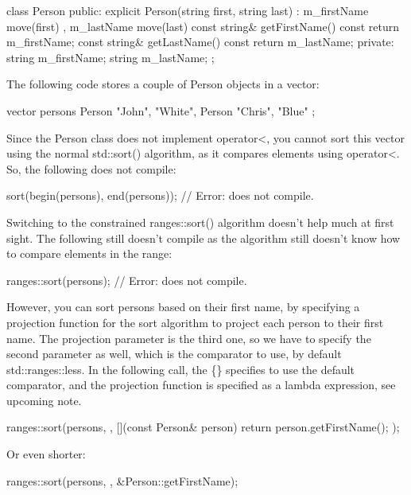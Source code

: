 \begin{cpp}
class Person
{
    public:
        explicit Person(string first, string last)
            : m_firstName { move(first) }, m_lastName { move(last) } { }
        const string& getFirstName() const { return m_firstName; }
        const string& getLastName() const { return m_lastName; }
    private:
        string m_firstName;
        string m_lastName;
};
\end{cpp}

The following code stores a couple of Person objects in a vector:

\begin{cpp}
vector persons { Person {"John", "White"}, Person {"Chris", "Blue"} };
\end{cpp}

Since the Person class does not implement operator<, you cannot sort this vector using the normal std::sort() algorithm, as it compares elements using operator<. So, the following does not compile:

\begin{cpp}
sort(begin(persons), end(persons)); // Error: does not compile.
\end{cpp}

Switching to the constrained ranges::sort() algorithm doesn’t help much at first sight. The following still doesn’t compile as the algorithm still doesn’t know how to compare elements in the range:

\begin{cpp}
ranges::sort(persons); // Error: does not compile.
\end{cpp}

However, you can sort persons based on their first name, by specifying a projection function for the sort algorithm to project each person to their first name. The projection parameter is the third one, so we have to specify the second parameter as well, which is the comparator to use, by default std::ranges::less. In the following call, the \{\} specifies to use the default comparator, and the projection function is specified as a lambda expression, see upcoming note.

\begin{cpp}
ranges::sort(persons, {},
    [](const Person& person) { return person.getFirstName(); });
\end{cpp}

Or even shorter:

\begin{cpp}
ranges::sort(persons, {}, &Person::getFirstName);
\end{cpp}

